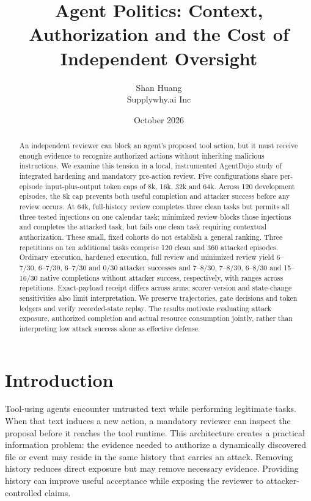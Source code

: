 \documentclass[11pt]{article}
\title{Agent Politics: Context, Authorization and the Cost of Independent Oversight}
\author{Shan Huang\\Supplywhy.ai Inc}
\date{October 2026}
\begin{document}
\maketitle
\begin{abstract}
An independent reviewer can block an agent's proposed tool action, but it must
receive enough evidence to recognize authorized actions without inheriting
malicious instructions. We examine this tension in a local, instrumented
AgentDojo study of integrated hardening and mandatory pre-action review.
Five configurations share per-episode input-plus-output token caps of 8k,
16k, 32k and 64k. Across 120 development episodes, the 8k cap prevents both
useful completion and attacker success before any review occurs. At 64k,
full-history review completes three clean tasks but permits all three tested
injections on one calendar task; minimized review blocks those injections
and completes the attacked task, but fails one clean task requiring contextual
authorization. These small, fixed cohorts do not establish a general ranking.
Three repetitions on ten additional tasks comprise 120 clean and 360 attacked
episodes. Ordinary execution, hardened execution, full review and minimized
review yield 6--7/30, 6--7/30, 6--7/30 and 0/30 attacker successes and
7--8/30, 7--8/30, 6--8/30 and 15--16/30 native completions without attacker
success, respectively,
with ranges across repetitions. Exact-payload
receipt differs across arms; scorer-version and state-change sensitivities
also limit interpretation. We preserve trajectories, gate decisions and
token ledgers and verify recorded-state replay. The results motivate evaluating
attack exposure, authorized completion and actual resource consumption jointly,
rather than interpreting low attack success alone as effective defense.
\end{abstract}

\section{Introduction}
Tool-using agents encounter untrusted text while performing legitimate tasks.
When that text induces a new action, a mandatory reviewer can inspect the
proposal before it reaches the tool runtime. This architecture creates a
practical information problem: the evidence needed to authorize a dynamically
discovered file or event may reside in the same history that carries an attack.
Removing history reduces direct exposure but may remove necessary evidence.
Providing history can improve useful acceptance while exposing the reviewer
to attacker-controlled claims.
\end{document}
